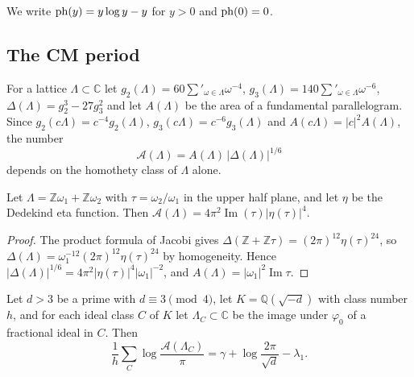 We write $\operatorname{ph}(y)=y\log y-y$ for $y>0$ and $\operatorname{ph}(0)=0$.

\subsection{The CM period}\label{r4:sec:R4period}

For a lattice $\Lambda\subset\mathbb C$ let $g_2(\Lambda)=60\sum'_{\omega\in\Lambda}\omega^{-4}$, $g_3(\Lambda)=140\sum'_{\omega\in\Lambda}\omega^{-6}$, $\Delta(\Lambda)=g_2^3-27g_3^2$ and let $A(\Lambda)$ be the area of a fundamental parallelogram. Since $g_2(c\Lambda)=c^{-4}g_2(\Lambda)$, $g_3(c\Lambda)=c^{-6}g_3(\Lambda)$ and $A(c\Lambda)=\lvert c\rvert^2A(\Lambda)$, the number
\[
\mathcal A(\Lambda)=A(\Lambda)\,\lvert\Delta(\Lambda)\rvert^{1/6}
\]
depends on the homothety class of $\Lambda$ alone.

\begin{lemma}\label{r4:R4:areaeta}
Let $\Lambda=\mathbb Z\omega_1+\mathbb Z\omega_2$ with $\tau=\omega_2/\omega_1$ in the upper half plane, and let $\eta$ be the Dedekind eta function. Then $\mathcal A(\Lambda)=4\pi^2\operatorname{Im}(\tau)\lvert\eta(\tau)\rvert^4$.
\end{lemma}

\begin{proof}
The product formula of Jacobi gives $\Delta(\mathbb Z+\mathbb Z\tau)=(2\pi)^{12}\eta(\tau)^{24}$, so $\Delta(\Lambda)=\omega_1^{-12}(2\pi)^{12}\eta(\tau)^{24}$ by homogeneity. Hence $\lvert\Delta(\Lambda)\rvert^{1/6}=4\pi^2\lvert\eta(\tau)\rvert^4\lvert\omega_1\rvert^{-2}$, and $A(\Lambda)=\lvert\omega_1\rvert^2\operatorname{Im}\tau$.
\end{proof}

\begin{proposition}\label{r4:R4:kronecker}
Let $d>3$ be a prime with $d\equiv3\pmod4$, let $K=\mathbb Q(\sqrt{-d})$ with class number $h$, and for each ideal class $C$ of $K$ let $\Lambda_C\subset\mathbb C$ be the image under $\varphi_0$ of a fractional ideal in $C$. Then
\[
\frac1h\sum_C\log\frac{\mathcal A(\Lambda_C)}\pi=\gamma+\log\frac{2\pi}{\sqrt d}-\lambda_1 .
\]
\end{proposition}

